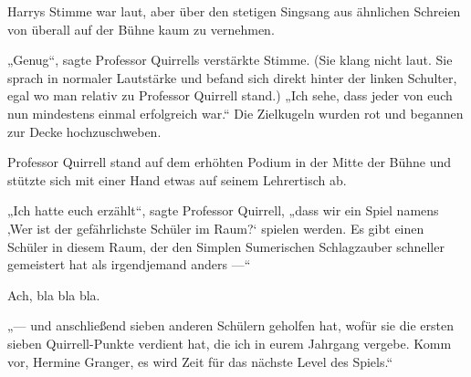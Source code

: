  Harrys Stimme war laut, aber über den stetigen Singsang aus ähnlichen Schreien von überall auf der Bühne kaum zu vernehmen.

„Genug“, sagte Professor Quirrells verstärkte Stimme. (Sie klang nicht laut. Sie sprach in normaler Lautstärke und befand sich direkt hinter der linken Schulter, egal wo man relativ zu Professor Quirrell stand.)
„Ich sehe, dass jeder von euch nun mindestens einmal erfolgreich war.“ Die Zielkugeln wurden rot und begannen zur Decke hochzuschweben.

Professor Quirrell stand auf dem erhöhten Podium in der Mitte der Bühne und stützte sich mit einer Hand etwas auf seinem Lehrertisch ab.

„Ich hatte euch erzählt“, sagte Professor Quirrell, „dass wir ein Spiel namens ‚Wer ist der gefährlichste Schüler im Raum?‘ spielen werden. Es gibt einen Schüler in diesem Raum, der den Simplen Sumerischen Schlagzauber schneller gemeistert hat als irgendjemand anders —“

Ach, bla bla bla.

„— und anschließend sieben anderen Schülern geholfen hat, wofür sie die ersten sieben Quirrell-Punkte verdient hat, die ich in eurem Jahrgang vergebe. Komm vor, Hermine Granger, es wird Zeit für das nächste Level des Spiels.“

